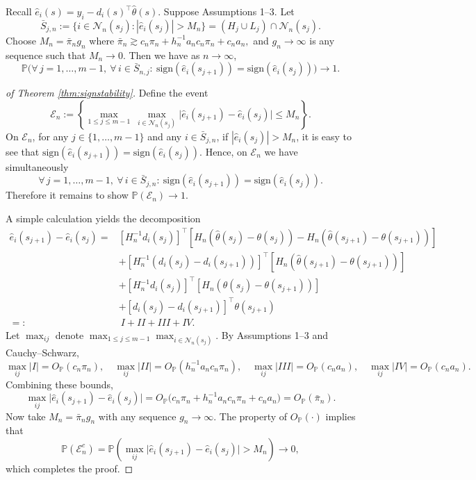 \documentclass[lineno]{biometrika}
\begin{document}
\begin{theorem}
\label{thm:signstability}
Recall $\hat e_i(s)=y_i-d_i(s)^\top\hat\theta(s)$. Suppose Assumptions 1--3.
Let
\[
\bar S_{j,n}:=\Big\{i\in \mathcal N_n(s_j): |\hat e_i(s_j)|>M_n\Big\}
= (H_j\cup L_j)\cap \mathcal N_n(s_j).
\]
Choose $M_n=\bar\pi_n g_n$ where $\bar\pi_n\gtrsim c_n\pi_n+h_n^{-1}a_n c_n\pi_n+c_n a_n,$
and $g_n\to\infty$ is any sequence such that $M_n\to 0$.
Then we have as $n\to\infty$,
\begin{equation}
    \mathbb{P}\Big(\forall\, j=1,\dots,m-1,\ \forall\, i\in \bar S_{n,j}:\ 
    \text{sign}(\hat e_i(s_{j+1}))=\text{sign}(\hat e_i(s_j))
\Big)\to 1.
\end{equation}

\end{theorem}

\begin{proof}[of Theorem \ref{thm:signstability}]
Define the event
\[
\mathcal E_n
:=\left\{
\max_{1\le j\le m-1}\ \max_{i\in \mathcal N_n(s_j)}
\big|\hat e_i(s_{j+1})-\hat e_i(s_j)\big|
\le M_n
\right\}.
\]
On $\mathcal E_n$, for any $j\in\{1,\dots,m-1\}$ and any $i\in \bar S_{j,n}$, if $|\hat{e}_i(s_j)|>M_n$, it is easy to see that $\text{sign}(\hat e_i(s_{j+1}))=\text{sign}(\hat e_i(s_j))$. Hence, on $\mathcal E_n$ we have simultaneously
\[
\forall\, j=1,\dots,m-1,\ \forall\, i\in \bar S_{j,n}:\ 
\text{sign}(\hat e_i(s_{j+1}))=\text{sign}(\hat e_i(s_j)).
\]
Therefore it remains to show $\mathbb{P}(\mathcal E_n)\to 1$.

\medskip
A simple calculation yields the decomposition
\begin{equation}
\label{eq:residual_increment_decomp}
\begin{aligned}
\hat{e}_i(s_{j+1})-\hat e_i(s_j)
=&\left[H_n^{-1}d_i(s_j)\right]^\top\left[H_n(\hat\theta(s_j)-\theta(s_j))-H_n(\hat\theta(s_{j+1})-\theta(s_{j+1}))\right]\\
&+\left[H_n^{-1}(d_i(s_j)-d_i(s_{j+1}))\right]^\top \left[H_n(\hat\theta(s_{j+1})-\theta(s_{j+1}))\right]\\
&+\left[H_n^{-1}d_i(s_j)\right]^\top\left[H_n(\theta(s_j)-\theta(s_{j+1}))\right]\\
&+\left[d_i(s_j)-d_i(s_{j+1})\right]^\top\theta(s_{j+1})\\
=:&\ I+II+III+IV.
\end{aligned}
\end{equation}
Let $\max_{ij}$ denote $\max_{1\le j\le m-1}\max_{i\in\mathcal N_n(s_j)}$.
By Assumptions 1--3 and Cauchy--Schwarz,
\[
\max_{ij}|I|=O_{\mathbb{P}}(c_n\pi_n),\quad
\max_{ij}|II|=O_{\mathbb{P}}(h_n^{-1}a_n c_n\pi_n),\quad
\max_{ij}|III|=O_{\mathbb{P}}(c_n a_n),\quad
\max_{ij}|IV|=O_{\mathbb{P}}(c_n a_n).
\]
Combining these bounds,
\[
\max_{ij}\big|\hat e_i(s_{j+1})-\hat e_i(s_j)\big|
=O_{\mathbb{P}}\big(c_n\pi_n+h_n^{-1}a_n c_n\pi_n+c_n a_n\big)
=O_{\mathbb{P}}(\bar\pi_n).
\]
Now take $M_n=\bar\pi_n g_n$ with any sequence $g_n\to\infty$. The property of $O_{\mathbb{P}}(\cdot)$ implies that
\[
\mathbb{P}(\mathcal E_n^c)
=\mathbb{P}\left(
\max_{ij}\big|\hat e_i(s_{j+1})-\hat e_i(s_j)\big|>M_n
\right)
\to 0,
\]
which completes the proof.
\end{proof}
\end{document}
